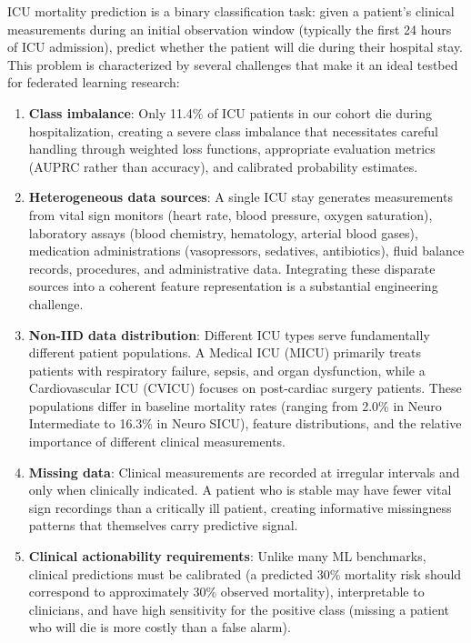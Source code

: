 \documentclass[11pt,a4paper]{report}
\begin{document}
ICU mortality prediction is a binary classification task: given a patient's clinical measurements during an initial observation window (typically the first 24 hours of ICU admission), predict whether the patient will die during their hospital stay. This problem is characterized by several challenges that make it an ideal testbed for federated learning research:

\begin{enumerate}[leftmargin=2em]
\item \textbf{Class imbalance}: Only 11.4\% of ICU patients in our cohort die during hospitalization, creating a severe class imbalance that necessitates careful handling through weighted loss functions, appropriate evaluation metrics (AUPRC rather than accuracy), and calibrated probability estimates.
\item \textbf{Heterogeneous data sources}: A single ICU stay generates measurements from vital sign monitors (heart rate, blood pressure, oxygen saturation), laboratory assays (blood chemistry, hematology, arterial blood gases), medication administrations (vasopressors, sedatives, antibiotics), fluid balance records, procedures, and administrative data. Integrating these disparate sources into a coherent feature representation is a substantial engineering challenge.
\item \textbf{Non-IID data distribution}: Different ICU types serve fundamentally different patient populations. A Medical ICU (MICU) primarily treats patients with respiratory failure, sepsis, and organ dysfunction, while a Cardiovascular ICU (CVICU) focuses on post-cardiac surgery patients. These populations differ in baseline mortality rates (ranging from 2.0\% in Neuro Intermediate to 16.3\% in Neuro SICU), feature distributions, and the relative importance of different clinical measurements.
\item \textbf{Missing data}: Clinical measurements are recorded at irregular intervals and only when clinically indicated. A patient who is stable may have fewer vital sign recordings than a critically ill patient, creating informative missingness patterns that themselves carry predictive signal.
\item \textbf{Clinical actionability requirements}: Unlike many ML benchmarks, clinical predictions must be calibrated (a predicted 30\% mortality risk should correspond to approximately 30\% observed mortality), interpretable to clinicians, and have high sensitivity for the positive class (missing a patient who will die is more costly than a false alarm).
\end{enumerate}
\end{document}
